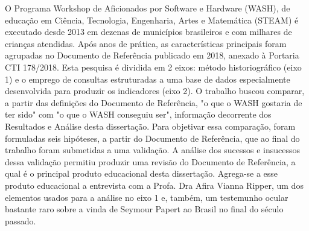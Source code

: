 
\begin{resumoutfpr}%

O  Programa Workshop de Aficionados por Software e Hardware (WASH), de educação em Ciência, Tecnologia, Engenharia, Artes e Matemática (STEAM) é executado desde 2013 em dezenas de municípios brasileiros e com milhares de crianças atendidas. Após anos de prática, as características principais foram agrupadas no Documento de Referência publicado em 2018, anexado à Portaria CTI 178/2018. Esta pesquisa é dividida em 2 eixos: método historiográfico (eixo 1) e o emprego de consultas estruturadas a uma base de dados especialmente desenvolvida para produzir os indicadores (eixo 2). O trabalho buscou comparar, a partir das definições do Documento de Referência, "o que o WASH gostaria de ter sido" com "o que o WASH conseguiu ser", informação decorrente dos Resultados e Análise desta dissertação. Para objetivar essa comparação, foram formuladas seis hipóteses, a partir do Documento de Referência, que ao final do trabalho foram submetidas a uma validação.  A análise dos sucessos e insucessos dessa validação permitiu produzir uma revisão do Documento de Referência, a qual é o principal produto educacional desta dissertação. Agrega-se a esse produto educacional a entrevista com a Profa. Dra Afira Vianna Ripper, um dos elementos usados para a análise no eixo 1 e, também, um testemunho ocular bastante raro sobre a vinda de Seymour Papert ao Brasil no final do século passado.

\end{resumoutfpr}

